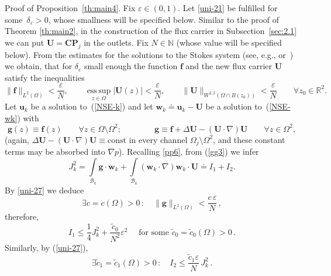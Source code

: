 \documentclass[11pt]{article}
\numberwithin{equation}{section}
\numberwithin{figure}{section}
\newcommand{\R}{\mathbb{R}}
\newcommand{\esssup}{\mathop{\mathrm{ess\,sup}}}
\def\const{{\mathrm{const}}}
\def\R{{\mathbb R}}
\def\ue{{\mathbf u}}
\def\UU{{\mathbf U}}
\def\cc{{\tilde c}}
\def\fe{{\mathbf f}}
\def\we{{\mathbf w}}
\def\e{{\varepsilon}}
\def\fe{{\mathbf f}}
\begin{document}
\medskip
{\sc Proof of Proposition~\ref{th:main4}}. Fix $\e\in(0,1)$. Let \eqref{uni-21} be fulfilled for some~$\delta_\e>0$, whose smallness will be specified below. Similar to the proof of Theorem \ref{th:main2}, in the construction
of the flux carrier in Subsection~\ref{sec:2.1} we can put $\mathbf{U} = \mathbf{CP}_j$ in the outlets. Fix $N\in\mathbb{N}$ (whose value will be specified below). From the estimates for the solutions to the Stokes
system (see, e.g., \cite[Section~IV.6]{galdi2011introduction} or
\cite[Section~2.4.2]{korobkov2024steady}\,)  we obtain, that for $\delta_\e$ small enough the function $\fe$ and the new flux carrier $\UU$ satisfy the inequalities
\begin{equation}  \label{uni-27}
\|\fe\|_{L^2(\Omega)}<\frac{\e}{N},\qquad\esssup\limits_{z\in\Omega}|\UU(z)|<\frac{\e}{N},\qquad\|\UU\|_{W^{2,2}(\Omega\cap B(z_0))}<\frac{\e}{N}\qquad\forall z_0\in\R^2.
\end{equation}
Let $\ue_k$ be a solution to~(\ref{NSE-k}) and let $\we_k\doteq\ue_k-\UU$ be a solution to~(\ref{NSE-wk}) with
\begin{equation}  \label{uni-29}
\mathbf{g}(z)\equiv \mathbf{f}(z)\qquad\forall z\in\Omega\setminus\Omega^2; \qquad\qquad \mathbf{g}\equiv\mathbf{f}+\Delta \mathbf{U} - (\mathbf{U} \cdot \nabla) \mathbf{U}\qquad\forall z\in\Omega^2,
\end{equation}
(again, $\Delta \mathbf{U} - (\mathbf{U} \cdot \nabla) \mathbf{U}\equiv\const$ in every channel $\Omega_j\setminus\Omega^2$, and these constant
terms may be absorbed into $\nabla p$). Recalling \eqref{pp6}, from (\ref{gg3}) we infer
\begin{equation}\label{uni-32}
J_k^2= \int\limits_{\mathcal{B}_k}\mathbf{g}\cdot\we_k+\int\limits_{\mathcal{B}_k}(\mathbf{w}_k \cdot \nabla) \we_k\cdot\mathbf{U}\doteq I_1+I_2.
\end{equation}
By \eqref{uni-27} we deduce
\begin{equation}\label{uni-33-1}
\exists c=c(\Omega)>0\, :\quad\|\mathbf{g}\|_{L^2(\Omega)}<\frac{c\, \e}{N}\,,
\end{equation}
therefore, 
\begin{equation}\label{uni-33} I_1\le \frac14 J_k^2+\frac{\cc_0}{N^2}\e^2 \quad\mbox{ for some \ }\cc_0=\cc_0(\Omega)>0\, .
\end{equation}
Similarly, by (\ref{uni-27}),
\begin{equation}\label{uni-34}
\exists \cc_1=\cc_1(\Omega)>0\, :\quad I_2\le \frac{\cc_1 \varepsilon}{N} \,J_k^2\, .
\end{equation}
\end{document}
